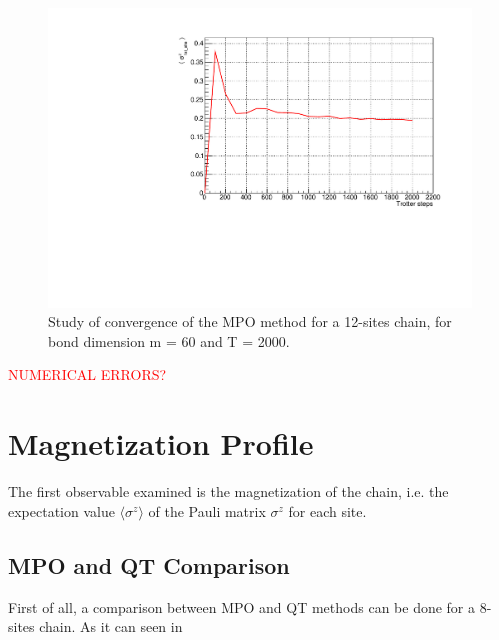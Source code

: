 \begin{figure}[H]
    \centering
    \includegraphics[scale=0.7]{Figures/12sites/ConvergenceLML012m060Time002000_J10505.pdf}
    \caption{Study of convergence of the MPO method for a 12-sites chain, for bond dimension m = 60 and T = 2000.}
    \label{fig:my_label}
\end{figure}

\textcolor{red}{NUMERICAL ERRORS?}

\section{Magnetization Profile}
\label{sec:magn_profile}
The first observable examined is the magnetization of the chain, i.e. the expectation value $\langle \sigma^z \rangle$ of the Pauli matrix $\sigma^z$ for each site. 

\subsection{MPO and QT Comparison}
First of all, a comparison between MPO and QT methods can be done for a 8-sites chain. As it can seen in 

